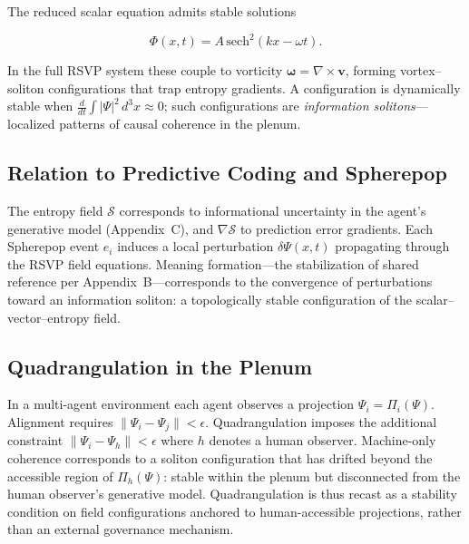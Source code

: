 \documentclass[12pt,a4paper]{article}
\begin{document}
The reduced scalar equation admits stable solutions

\[
\Phi(x,t) = A\,\mathrm{sech}^2(kx - \omega t).
\]

In the full RSVP system these couple to vorticity $\boldsymbol{\omega} = \nabla\times\mathbf{v}$,
forming vortex--soliton configurations that trap entropy gradients. A configuration is
dynamically stable when $\frac{d}{dt}\!\int|\Psi|^2\,d^3x \approx 0$; such configurations
are \emph{information solitons}---localized patterns of causal coherence in the plenum.

\subsection*{Relation to Predictive Coding and Spherepop}

The entropy field $\mathcal{S}$ corresponds to informational uncertainty in the agent's
generative model (Appendix~C), and $\nabla\mathcal{S}$ to prediction error gradients. Each
Spherepop event $e_i$ induces a local perturbation $\delta\Psi(x,t)$ propagating through the
RSVP field equations. Meaning formation---the stabilization of shared reference per
Appendix~B---corresponds to the convergence of perturbations toward an information soliton:
a topologically stable configuration of the scalar--vector--entropy field.

\subsection*{Quadrangulation in the Plenum}

In a multi-agent environment each agent observes a projection $\Psi_i = \Pi_i(\Psi)$.
Alignment requires $\|\Psi_i - \Psi_j\| < \epsilon$. Quadrangulation \citep{jelinek2026}
imposes the additional constraint $\|\Psi_i - \Psi_h\| < \epsilon$ where $h$ denotes a human
observer. Machine-only coherence corresponds to a soliton configuration that has drifted
beyond the accessible region of $\Pi_h(\Psi)$: stable within the plenum but disconnected from
the human observer's generative model. Quadrangulation is thus recast as a stability condition
on field configurations anchored to human-accessible projections, rather than an external
governance mechanism.

\newpage


\end{document}
